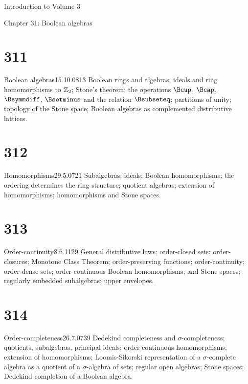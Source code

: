      
Introduction to Volume 3 
     
     
 Chapter 31:  Boolean algebras
     
     
\section{311}{Boolean algebras}{15.10.08}{13}{}
{Boolean rings and algebras;  ideals and ring homomorphisms to
$\Bbb{Z}_2$;  Stone's theorem;  the operations $\Bcup$, $\Bcap$,
$\Bsymmdiff$, $\Bsetminus$ and the relation $\Bsubseteq$;  partitions of
unity;  topology of
the Stone space;   Boolean algebras as complemented distributive
lattices.}
     
\section{312}{Homomorphisms}{29.5.07}{21}{}
{Subalgebras;  ideals;  Boolean homomorphisms;  the ordering
determines the ring structure;  quotient algebras;  extension of
homomorphisms;  homomorphisms and Stone spaces.}
     
\section{313}{Order-continuity}{8.6.11}{29}{}
{General distributive laws;  order-closed sets;  order-closures;
Monotone Class Theorem;  order-preserving functions;  order-continuity;
order-dense sets;  order-continuous Boolean homomorphisms;  and Stone
spaces;  regularly embedded subalgebras;  upper envelopes.}
     
\section{314}{Order-completeness}{26.7.07}{39}{}
{Dedekind completeness and $\sigma$-completeness;  quotients,
subalgebras, principal ideals;  order-continuous homomorphisms;
extension of homomorphisms;  Loomis-Sikorski representation of a
$\sigma$-complete algebra as a quotient of a $\sigma$-algebra of sets;
regular open algebras;  Stone spaces;  Dedekind completion of a Boolean
algebra.}
     
